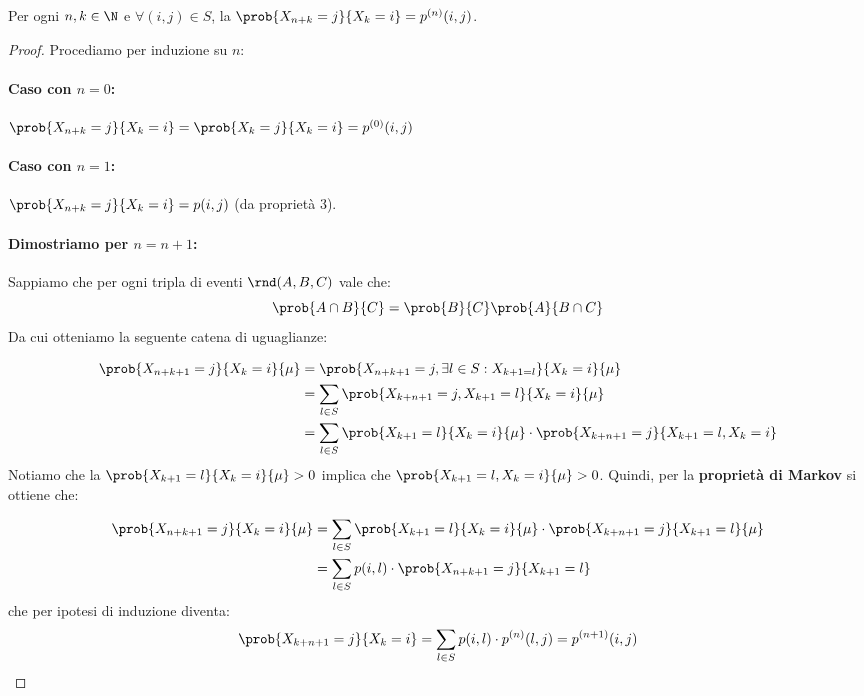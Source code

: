 \documentclass[\main/main.tex]{subfiles}
\begin{document}
\begin{proposition}
  Per ogni \(n,k \in \N \) e \(\forall (i,j) \in S\), la \(\prob{X_{n+k} = j}{X_k = i} = p^{(n)}(i,j)\).
\end{proposition}
\begin{proof}
  Procediamo per induzione su \(n\):
  \paragraph*{Caso con \(n=0\): } \(\prob{X_{n+k}=j}{X_k=i} = \prob{X_k = j}{X_k = i} = p^{(0)}(i,j)\)
  \paragraph*{Caso con \(n=1\): } \(\prob{X_{n+k}=j}{X_k=i} = p(i,j)\) (da proprietà 3).

  \paragraph*{Dimostriamo per \(n=n+1\):}

  Sappiamo che per ogni tripla di eventi \(\rnd(A,B,C)\) vale che:
  \[
    \prob{A\cap B}{C} = \prob{B}{C}\prob{A}{B\cap C}
  \]
  Da cui otteniamo la seguente catena di uguaglianze:

  \begin{align*}
    \prob{X_{n+k+1}=j}{X_k = i}{\mu} & = \prob{X_{n+k+1}=j, \exists l \in S: X_{k+1 = l}}{X_k = i}{\mu}                              \\
                                     & = \sum_{l \in S} \prob{X_{k+n+1}=j, X_{k+1}=l}{X_k = i}{\mu}                                  \\
                                     & = \sum_{l \in S} \prob{X_{k+1} = l}{X_k = i}{\mu}\cdot \prob{X_{k+n+1}=j}{X_{k+1} = l, X_k=i}
  \end{align*}
  Notiamo che la \(\prob{X_{k+1} = l}{X_k = i}{\mu} > 0\) implica che \(\prob{X_{k+1} = l, X_k = i}{\mu} > 0\). Quindi, per la \textbf{proprietà di Markov} si ottiene che:

  \begin{align*}
    \prob{X_{n+k+1}=j}{X_k = i}{\mu} & = \sum_{l \in S}\prob{X_{k+1}=l}{X_k = i}{\mu}\cdot\prob{X_{k+n+1}=j}{X_{k+1} = l}{\mu} \\
                                     & = \sum_{l\in S} p(i,l)\cdot \prob{X_{n+k+1}=j}{X_{k+1} = l}
  \end{align*}
  che per ipotesi di induzione diventa:
  \[
    \prob{X_{k+n+1} = j}{X_k = i} = \sum_{l \in S} p(i,l)\cdot p^{(n)}(l,j) = p^{(n+1)}(i,j)
  \]
\end{proof}
\end{document}
